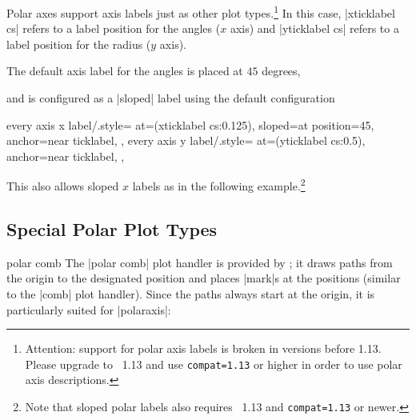 {Polar axes support axis labels just as other plot types.\footnote{Attention: support for polar axis labels is broken in versions before 1.13. Please upgrade to \PGFPlots\ 1.13 and use \texttt{compat=1.13} or higher in order to use polar axis descriptions.} In this case, |xticklabel cs| refers to a label position for the angles ($x$ axis) and |yticklabel cs| refers to a label position for the radius ($y$ axis).

The default axis label for the angles is placed at $45$ degrees, 
\begin{codeexample}[]
\end{codeexample}
and is configured as a |sloped| label using the default configuration
\begin{codeexample}
	every axis x label/.style={
		at={(xticklabel cs:0.125)},
		sloped={at position=45},
		anchor=near ticklabel,
	},
	every axis y label/.style={
		at={(yticklabel cs:0.5)},
		anchor=near ticklabel,
	},
\end{codeexample}

This also allows sloped $x$ labels as in the following example.\footnote{Note that sloped polar labels also requires \PGFPlots\ 1.13 and \texttt{compat=1.13} or newer.}
\begin{codeexample}[]
\end{codeexample}


\subsection{Special Polar Plot Types}
\begin{plottype}{polar comb}
	The |polar comb| plot handler is provided by \Tikz; it draws paths from the origin to the designated position and places |mark|s at the positions (similar to the |comb| plot handler). Since the paths always start at the origin, it is particularly suited for |polaraxis|:
\begin{codeexample}[]
\end{codeexample}
\end{plottype}

}
